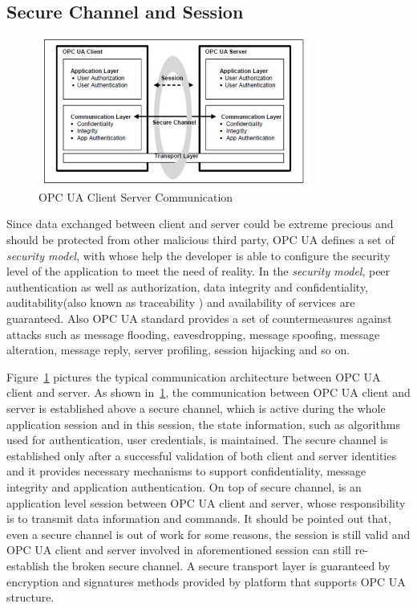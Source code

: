 \subsection{Secure Channel and Session}

\begin{figure}[!htbp]
	\centering
	\includegraphics[width=0.8\textwidth]{opc_ua_cs_comm.jpg}
		\caption{OPC UA Client Server Communication\cite{O2}}
	\label{fig:opc_ua_cs_comm}
\end{figure}

Since data exchanged between client and server could be extreme precious and should be protected from other malicious third party, OPC UA defines a set of  \emph{security model}, with whose help the developer is able to  configure the security level of the application to meet the need of reality. In the \emph{security model}, peer authentication as  well as authorization, data integrity and confidentiality, auditability(also known as traceability ) and availability of services are guaranteed. Also OPC UA  standard provides a set of countermeasures against attacks such as message flooding, eavesdropping, message spoofing, message alteration, message reply, server profiling, session hijacking and so on\cite{O2}.


Figure~\ref{fig:opc_ua_cs_comm} pictures the typical communication architecture between OPC UA client and server. As shown in~\ref{fig:opc_ua_cs_comm}, the communication between OPC UA client and server is established above a secure channel, which is active during the whole application session and in this session, the state information, such as algorithms used for authentication, user credentials, is maintained. The secure channel is established only after a successful validation of both client and server identities and it provides necessary mechanisms to support confidentiality, message integrity and application authentication. On top of secure channel, is an application level session between OPC UA client and server, whose responsibility is to transmit data information and commands. It should be pointed out that, even a secure channel is out of work for some reasons, the session is still valid and OPC UA client and server involved in aforementioned session can still re-establish the broken secure channel. A secure transport layer is guaranteed by encryption and signatures methods provided by platform that supports OPC UA structure.

